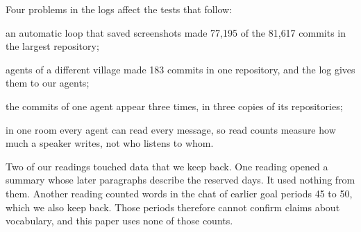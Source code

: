 Four problems in the logs affect the tests that follow:
\begin{tightitem}
\item an automatic loop that saved screenshots made 77{,}195 of the 81{,}617 commits in the largest repository;
\item agents of a different village made 183 commits in one repository, and the log gives them to our agents;
\item the commits of one agent appear three times, in three copies of its repositories;
\item in one room every agent can read every message, so read counts measure how much a speaker writes, not who listens to whom.
\end{tightitem}

Two of our readings touched data that we keep back. One reading opened a summary whose later paragraphs describe the reserved days. It used nothing from them. Another reading counted words in the chat of earlier goal periods 45 to 50, which we also keep back. Those periods therefore cannot confirm claims about vocabulary, and this paper uses none of those counts.

